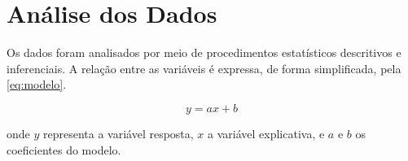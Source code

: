 \section{Análise dos Dados}
\label{sec:analise-dos-dados}

Os dados foram analisados por meio de procedimentos estatísticos descritivos e inferenciais. A relação entre as variáveis é expressa, de forma simplificada, pela \autoref{eq:modelo}.

\begin{equation}
    \label{eq:modelo}
    y = ax + b
\end{equation}

\noindent onde $y$ representa a variável resposta, $x$ a variável explicativa, e $a$ e $b$ os coeficientes do modelo.

%
%
